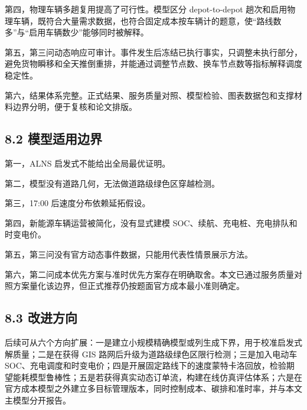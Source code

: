 \documentclass[UTF8,zihao=-4,a4paper]{ctexart}
\begin{document}
第四，物理车辆多趟复用提高了可行性。模型区分 depot-to-depot 趟次和启用物理车辆，既符合大量需求数据，也符合固定成本按车辆计的题意，使“路线数多”与“启用车辆数少”能够同时被解释。

第五，第三问动态响应可审计。事件发生后冻结已执行事实，只调整未执行部分，避免货物瞬移和全天推倒重排，并能通过调整节点数、换车节点数等指标解释调度稳定性。

第六，结果体系完整。正式结果、服务质量对照、模型检验、图表数据包和支撑材料边界分明，便于复核和论文排版。

\subsection{8.2 模型适用边界}

第一，ALNS 启发式不能给出全局最优证明。

第二，模型没有道路几何，无法做道路级绿色区穿越检测。

第三，17:00 后速度分布依赖延拓假设。

第四，新能源车辆运营被简化，没有显式建模 SOC、续航、充电桩、充电排队和时变电价。

第五，第三问没有官方动态事件数据，只能用代表性情景展示方法。

第六，第二问成本优先方案与准时优先方案存在明确取舍。本文已通过服务质量对照方案量化该边界，但正式推荐仍按题面官方成本最小准则确定。

\subsection{8.3 改进方向}

后续可从六个方向扩展：一是建立小规模精确模型或列生成下界，用于校准启发式解质量；二是在获得 GIS 路网后升级为道路级绿色区限行检测；三是加入电动车 SOC、充电调度和时变电价；四是开展固定路线下的速度蒙特卡洛回放，检验期望能耗模型鲁棒性；五是若获得真实动态订单流，构建在线仿真评估体系；六是在官方成本模型之外建立多目标管理版本，同时控制成本、碳排和准时率，并与本文主模型分开报告。
\end{document}
